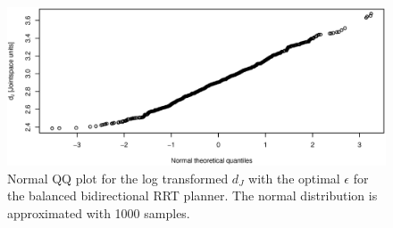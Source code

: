 \begin{figure}[H]
 \centering
 \includegraphics[width=\figsize]{graphics/qq_tran_op_ba}
 \caption{Normal QQ plot for the log transformed \(d_J\) with the optimal \(\epsilon\) for the balanced bidirectional RRT planner. The normal distribution is approximated with 1000 samples.}
 \label{fig:balanced_log_qq}
\end{figure}



